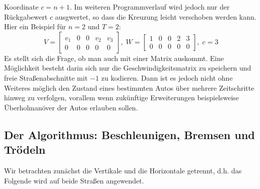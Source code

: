 Koordinate \(c = n+1\). Im weiteren Programmverlauf wird jedoch nur der Rückgabewert \(c\) ausgwertet, so dass die Kreuzung
leicht verschoben werden kann. Hier ein Beispiel für \(n=2\) und \(T=2\):
\[
  V = 
  \begin{bmatrix}
    v_1& 0& 0& v_2& v_3 \\
    0& 0& 0& 0& 0
  \end{bmatrix}, \;
  W = 
  \begin{bmatrix}
    1& 0& 0& 2& 3 \\
    0& 0& 0& 0& 0
  \end{bmatrix}, \;
  c = 3
\]
Es stellt sich die Frage, ob man auch mit einer Matrix auskommt. Eine Möglichkeit besteht darin sich nur die Geschwindigkeitsmatrix 
zu speichern und freie Straßenabschnitte mit \(-1\) zu kodieren. Dann ist es jedoch nicht ohne Weiteres möglich den Zustand eines bestimmten Autos über
mehrere Zeitschritte hinweg zu verfolgen, vorallem wenn zukünftige Erweiterungen beispielsweise Überholmanöver der Autos erlauben sollen.

\subsection{Der Algorithmus: Beschleunigen, Bremsen und Trödeln}
Wir betrachten zunächst die Vertikale und die Horizontale getrennt, d.h. das Folgende wird
auf beide Straßen angewendet.

